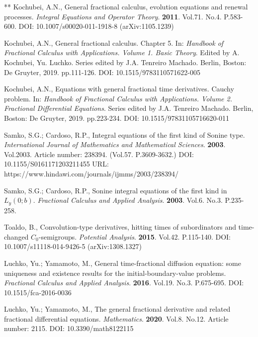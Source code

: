 \documentclass[12pt]{article}
\begin{document}
\begin{thebibliography}{**}
 Kochubei, A.N., 
General fractional calculus, evolution equations and renewal processes. 
\textit{Integral Equations and Operator Theory}. 
\textbf{2011}. Vol.71. No.4. P.583-600. 
DOI: 10.1007/s00020-011-1918-8 (arXiv:1105.1239)

 Kochubei, A.N., 
General fractional calculus. Chapter 5. 
In: \textit{Handbook of Fractional Calculus with Applications. 
Volume 1. Basic Theory}. Edited by A. Kochubei, Yu. Luchko. Series edited by J.A. Tenreiro Machado. Berlin, Boston: De Gruyter, 2019. pp.111-126. 
DOI: 10.1515/9783110571622-005

 Kochubei, A.N., 
Equations with general fractional time derivatives. Cauchy problem. In: \textit{Handbook of Fractional Calculus with Applications. Volume 2. Fractional Differential Equations}. 
Series edited by J.A. Tenreiro Machado. Berlin, Boston: De Gruyter, 2019. pp.223-234. 
DOI: 10.1515/97831105716620-011


 Samko, S.G.; Cardoso, R.P.,
Integral equations of the first kind of Sonine type. 
\textit {International Journal of Mathematics and Mathematical Sciences}. 
\textbf{2003}. Vol.2003. Article number: 238394. 
(Vol.57. P.3609-3632.) 
DOI: 10.1155/S0161171203211455
URL: https://www.hindawi.com/journals/ijmms/2003/238394/

 Samko, S.G.; Cardoso, R.P., 
Sonine integral equations of the first kind in $L_y(0; b)$.
\textit{Fractional Calculus and Applied Analysis}. 
\textbf{2003}. Vol.6. No.3. P.235-258.

 Toaldo, B., 
Convolution-type derivatives, hitting times of subordinators and time-changed $C_0$-semigroups. 
\textit{Potential Analysis}. 
\textbf{2015}. Vol.42. P.115-140.
DOI: 10.1007/s11118-014-9426-5 (arXiv:1308.1327)

 Luchko, Yu.; Yamamoto, M., 
General time-fractional diffusion equation: some uniqueness 
and existence results for the initial-boundary-value problems. 
\textit{Fractional Calculus and Applied Analysis}. 
\textbf{2016}. Vol.19. No.3. P.675-695.
DOI: 10.1515/fca-2016-0036

 Luchko, Yu.; Yamamoto, M.,
The general fractional derivative and related fractional differential equations. 
\textit{Mathematics}. 
\textbf{2020}. Vol.8. No.12. Article number: 2115. 
DOI: 10.3390/math8122115


\end{thebibliography}
\end{document}
